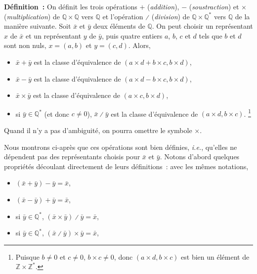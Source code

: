 \noindent\textbf{Définition :} On définit les trois opérations $+$ (\emph{addition}), $-$ (\emph{soustraction}) et $\times$ (\emph{multiplication}) de $\mathbb{Q} \times \mathbb{Q}$ vers $\mathbb{Q}$ et l'opération $\divslash$ (\emph{division}) de $\mathbb{Q} \times \mathbb{Q}^*$ vers $\mathbb{Q}$ de la manière suivante.  
\sindex[isy]{$+$}\sindex[isy]{$-$}\sindex[isy]{$\times$}\sindex[isy]{$\divslash$}
Soit $\bar{x}$ et $\bar{y}$ deux éléments de $\mathbb{Q}$. 
On peut choisir un représentant $x$ de $\bar{x}$ et un représentant $y$ de $\bar{y}$, puis quatre entiers $a$, $b$, $c$ et $d$ tels que $b$ et $d$ sont non nuls, $x = (a, b)$ et $y = (c, d)$.
Alors, 
\begin{itemize}[nosep]
    \item $\bar{x} + \bar{y}$ est la classe d'équivalence de $(a \times d + b \times c, b \times d)$,
    \item $\bar{x} - \bar{y}$ est la classe d'équivalence de $(a \times d - b \times c, b \times d)$,
    \item $\bar{x} \times \bar{y}$ est la classe d'équivalence de $(a \times c, b \times d)$,
    \item si $\bar{y} \in \mathbb{Q}^*$ (et donc $c \neq 0$), $\bar{x} \divslash \bar{y}$ est la classe d'équivalence de $(a \times d, b \times c)$.%
        \footnote{Puisque $b \neq 0$ et $c \neq 0$, $b \times c \neq 0$, donc $(a \times d, b \times c)$ est bien un élément de $\mathbb{Z} \times \mathbb{Z}^*$.}
\end{itemize}
Quand il n'y a pas d'ambiguité, on pourra omettre le symbole $\times$. 

\medskip

Nous montrons ci-après que ces opérations sont bien définies, \emph{i.e.}, qu'elles ne dépendent pas des représentants choisis pour $\bar{x}$ et $\bar{y}$.
Notons d'abord quelques propriétés découlant directement de leurs définitions : avec les mêmes notations, 
\begin{itemize}[nosep]
    \item $(\bar{x} + \bar{y}) - \bar{y} = \bar{x}$,
    \item $(\bar{x} - \bar{y}) + \bar{y} = \bar{x}$,
    \item si $\bar{y} \in \mathbb{Q}^*$, $(\bar{x} \times \bar{y}) \divslash \bar{y} = \bar{x}$,
    \item si $\bar{y} \in \mathbb{Q}^*$, $(\bar{x} \divslash \bar{y}) \times \bar{y} = \bar{x}$,
\end{itemize}

